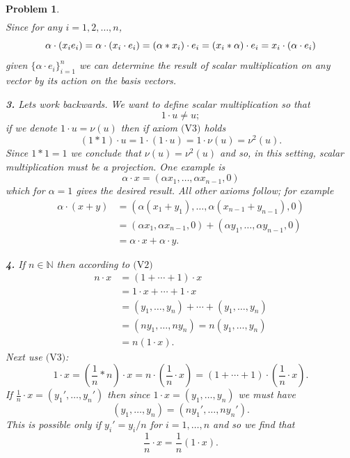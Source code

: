 \documentclass{article}
\theoremstyle{pprop}
\newtheorem{problem}{Problem}[section]
\begin{document}
\begin{problem}
\begin{align*}
\end{align*}
Since for any $i=1,2,\ldots,n$, 
$$
\alpha\cdot(x_i e_i)=\alpha\cdot(x_i\cdot e_i)=(\alpha * x_i) \cdot e_i \\
=(x_i * \alpha) \cdot e_i=x_i\cdot(\alpha\cdot e_i)
$$
given $\{\alpha \cdot e_i\}_{i=1}^n$ we can determine the result of scalar multiplication on any vector by its 
action on the basis vectors.
\par\noindent\textbf{3.} Lets work backwards. We want to define scalar multiplication so that 
$$1 \cdot u \neq u;$$
if we denote $1\cdot u=\nu(u)$ then if axiom $\text{(V3)}$ holds 
$$
(1*1)\cdot u=1\cdot(1 \cdot u)=1\cdot \nu(u)=\nu^2(u).
$$
Since $1*1=1$ we conclude that $\nu(u)=\nu^2(u)$ and so, in this setting, scalar multiplication must be a projection. One example is 
$$
\alpha \cdot x=(\alpha x_1,\ldots,\alpha x_{n-1},0)
$$
which for $\alpha=1$ gives the desired result. All other axioms follow; for example
\begin{align*}
\alpha\cdot(x+y)&=(\alpha(x_1+y_1),\ldots,\alpha(x_{n-1}+y_{n-1}),0) \\
& =(\alpha x_1 ,\alpha x_{n-1},0)+(\alpha y_1,\ldots,\alpha y_{n-1},0) \\
& = \alpha \cdot x + \alpha \cdot y.
\end{align*}
\par\noindent\textbf{4.} If $n \in \mathbb{N}$ then according to $\text{(V2)}$
\begin{align*}
n\cdot x & = (1+ \cdots + 1) \cdot x \\
& = 1 \cdot x + \cdots + 1 \cdot x \\ 
& = (y_1,\ldots,y_n)+ \cdots+(y_1,\ldots,y_n)\\
& = (n y_1,\ldots, n y_n)=n(y_1,\ldots,y_n)\\
&= n(1 \cdot x).
\end{align*}
Next use $\text{(V3)}$:
$$
1\cdot x =\left( \frac{1}{n}* n\right)\cdot x=n\cdot\left(\frac{1}{n} \cdot x\right)=(1+\cdots+1)\cdot \left(\frac{1}{n}\cdot x\right). 
$$
If $\frac{1}{n}\cdot x=(y_1',\ldots,y_n')$ then since $1\cdot x=(y_1,\ldots,y_n)$ we must have
$$
(y_1,\ldots,y_n)=(ny_1',\ldots,n y_n').
$$
This is possible only if $y_i'=y_i/n$ for $i=1,\ldots,n$ and so we find that
$$
\frac{1}{n}\cdot x=\frac{1}{n}(1 \cdot x).
$$


\end{problem}
\end{document}
